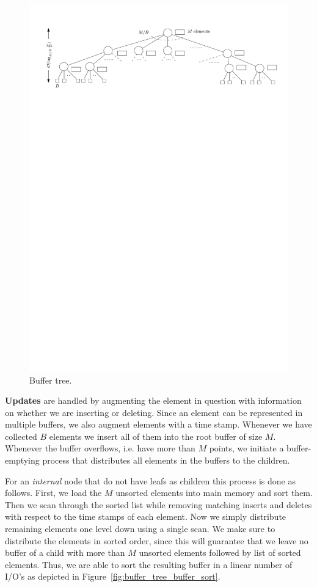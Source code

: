 \documentclass[twoside,11pt,openright]{report}
\begin{document}
\begin{figure}[h]
	\centering
	\includegraphics[width=1\textwidth]{../figures/buffer_tree}
	\caption{Buffer tree.}
	\label{fig:buffer_tree}
\end{figure}

\textbf{Updates} are handled by augmenting the element in question with information on whether we are inserting or deleting. Since an element can be represented in multiple buffers, we also augment elements with a time stamp.
Whenever we have collected $B$ elements we insert all of them into the root buffer of size $M$. Whenever the buffer overflows, i.e. have more than $M$ points, we initiate a buffer-emptying process that distributes all elements in the buffers to the children.

For an \textit{internal} node that do not have leafs as children this process is done as follows. First, we load the $M$ unsorted elements into main memory and sort them. Then we scan through the sorted list while removing matching inserts and deletes with respect to the time stamps of each element. Now we simply distribute remaining elements one level down using a single scan. We make sure to distribute the elements in sorted order, since this will guarantee that we leave no buffer of a child with more than $M$ unsorted elements followed by list of sorted elements. Thus, we are able to sort the resulting buffer in a linear number of I/O's as depicted in Figure~\ref{fig:buffer_tree_buffer_sort}.
\end{document}
